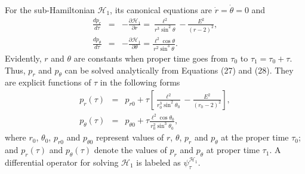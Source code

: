 \documentclass[preprint2]{aastex}
\begin{document}
For the sub-Hamiltonian $\mathcal{H}_1$, its canonical equations
are $\dot{r}=\dot{\theta}=0$ and
\begin{eqnarray}
\frac{dp_{r}}{d\tau} &=& -\frac{\partial \mathcal{H}_1}{\partial
r}
= \frac{\ell^{2}} {r^3\sin^2\theta}-\frac{E^{2}}{(r-2)^{2}},\\
\frac{dp_{\theta}}{d\tau} &=& -\frac{\partial
\mathcal{H}_1}{\partial \theta}= \frac{\ell^2\cos\theta}
{r^{2}\sin^{3}\theta}.
\end{eqnarray}
Evidently, $r$ and $\theta$ are constants when proper time goes
from $\tau_0$ to $\tau_1=\tau_0+\tau$. Thus, $p_r$ and
$p_{\theta}$ can be solved analytically from Equations (27) and
(28). They are explicit functions of $\tau$ in the following forms
\begin{eqnarray}
p_{r}(\tau) &=& p_{r0} +\tau
[\frac{\ell^{2}}{r^3_0\sin^2\theta_0}-\frac{E^{2}}{(r_0-2)^{2}}],\\
p_{\theta}(\tau) &=& p_{\theta0}+\tau \frac{\ell^2\cos\theta_0}
{r^{2}_0\sin^{3}\theta_0},
\end{eqnarray}
where $r_0$, $\theta_0$, $ p_{r0}$ and $p_{\theta0}$ represent
values of $r$, $\theta$, $ p_{r}$ and $p_{\theta}$ at the proper
time $\tau_0$; and $ p_{r}(\tau)$ and $p_{\theta}(\tau)$ denote
the values of $ p_{r}$ and $p_{\theta}$ at proper time $\tau_1$. A
differential operator for solving $\mathcal{H}_1$ is labeled as
$\psi^{\mathcal{H}_1}_{\tau}$.
\end{document}

